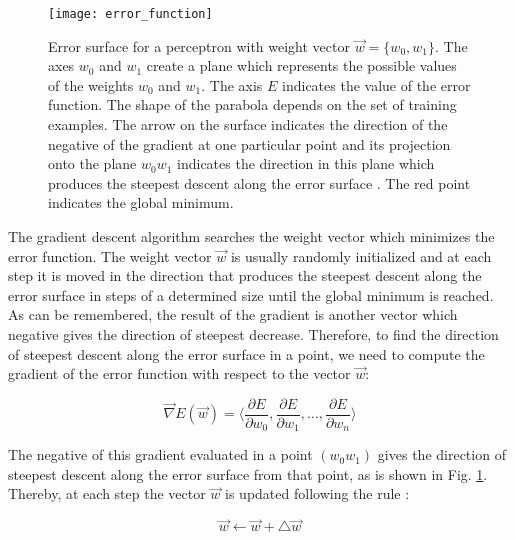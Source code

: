 \begin{figure}
\centering
\texttt{[image: error\_function]}
\caption[Error surface for a perceptron with weight vector $\vec{w}= \{ w_{0},w_{1} \}$.]{Error surface for a perceptron with weight vector $\vec{w}= \{ w_{0},w_{1} \}$. The axes $w_{0}$ and $w_{1}$ create a plane which represents the possible values of the weights $w_{0}$ and $w_{1}$. The axis $E$ indicates the value of the error function. The shape of the parabola depends on the set of training examples. The arrow on the surface indicates the direction of the negative of the gradient at one particular point and its projection onto the plane $w_{0}w_{1}$ indicates the direction in this plane which produces the steepest descent along the error surface \cite{machine_mitchell}. The red point indicates the global minimum.}
\label{fig:error_function}
\end{figure}

The gradient descent algorithm searches the weight vector which minimizes the error function. The weight vector $\vec{w}$ is usually randomly initialized and at each step it is moved in the direction that produces the steepest descent along the error surface in steps of a determined size until the global minimum is reached.\\

As can be remembered, the result of the gradient is another vector which negative gives the direction of steepest decrease. Therefore, to find the direction of steepest descent along the error surface in a point, we need to compute the gradient of the error function with respect to the vector $\vec{w}$:

\begin{equation}
	\vec{\nabla} E(\vec{w})=  \Bigg \langle \frac{\partial E}{\partial w_{0}}, \frac{\partial E}{\partial w_{1}}, \ldots , \frac{\partial E}{\partial w_{n}}     \Bigg \rangle
\end{equation}

The negative of this gradient evaluated in a point $(w_{0}w_{1})$ gives the direction of steepest descent along the error surface from that point, as is shown in Fig. \ref{fig:error_function}.\\

Thereby, at each step the vector $\vec{w}$ is updated following the rule \cite{machine_mitchell}:

\begin{equation}
\label{update_rule_gradient_descent}
	\vec{w} \leftarrow \vec{w} + \triangle \vec{w}
\end{equation}

